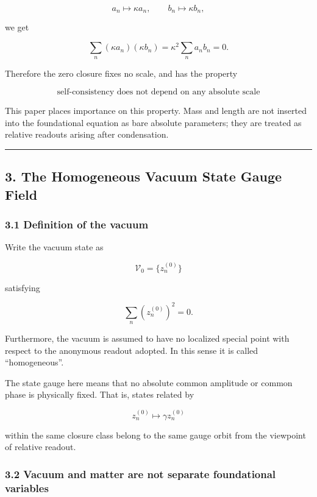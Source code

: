 \documentclass[
  a4paper,
]{article}
\begin{document}
\[
a_n\mapsto \kappa a_n,
\qquad
b_n\mapsto \kappa b_n,
\]

we get

\[
\sum_n(\kappa a_n)(\kappa b_n)
=
\kappa^2
\sum_n a_n b_n
=
0.
\]

Therefore the zero closure fixes no scale, and has the property

\[
\boxed{
\text{self-consistency does not depend on any absolute scale}
}
\]

This paper places importance on this property. Mass and length are not
inserted into the foundational equation as bare absolute parameters;
they are treated as relative readouts arising after condensation.

\begin{center}\rule{0.5\linewidth}{0.5pt}\end{center}

\subsection{3. The Homogeneous Vacuum State Gauge
Field}\label{the-homogeneous-vacuum-state-gauge-field}

\subsubsection{3.1 Definition of the
vacuum}\label{definition-of-the-vacuum}

Write the vacuum state as

\[
\mathcal V_0
=
\{z_n^{(0)}\}
\]

satisfying

\[
\sum_n
\left(z_n^{(0)}\right)^2
=
0.
\tag{4}
\]

Furthermore, the vacuum is assumed to have no localized special point
with respect to the anonymous readout adopted. In this sense it is
called ``homogeneous''.

The state gauge here means that no absolute common amplitude or common
phase is physically fixed. That is, states related by

\[
z_n^{(0)}
\mapsto
\gamma z_n^{(0)}
\]

within the same closure class belong to the same gauge orbit from the
viewpoint of relative readout.

\subsubsection{3.2 Vacuum and matter are not separate foundational
variables}\label{vacuum-and-matter-are-not-separate-foundational-variables}
\end{document}
